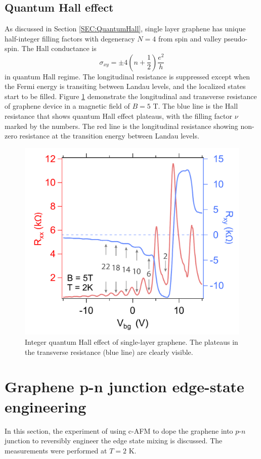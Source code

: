 \documentclass[pdflatex, sectionletters, 12pt, final, phd]{pittetd}    %
\begin{document}
\subsection{Quantum Hall effect}

As discussed in Section \ref{SEC:QuantumHall}, single layer graphene has unique half-integer filling factors with degeneracy $N = 4$ from spin and valley pseudo-spin. The Hall conductance is
$$
\sigma_{xy} = \pm 4\left(n + \frac{1}{2}\right)\frac{e^2}{h}
$$
in quantum Hall regime. The longitudinal resistance is suppressed except when the Fermi energy is transiting between Landau levels, and the localized states start to be filled. Figure \ref{FIG:HallResistance} demonstrate the longitudinal and transverse resistance of graphene device in a magnetic field of $B = 5$ T. The blue line is the Hall resistance that shows quantum Hall effect plateaus, with the filling factor $\nu$ marked by the numbers. The red line is the longitudinal resistance showing non-zero resistance at the transition energy between Landau levels.

\begin{figure}[h!]
	\centering
	\includegraphics[width=.55\textwidth]{Drawing/HallResistance.pdf}
	\caption[Integer quantum Hall effect of single-layer graphene]{Integer quantum Hall effect of single-layer graphene. The plateaus in the transverse resistance (blue line) are clearly visible.}
	\label{FIG:HallResistance}
\end{figure}

\section{Graphene p-n junction edge-state engineering}
\label{SEC:PNJunction}

In this section, the experiment of using c-AFM to dope the graphene into $p$-$n$ junction to reversibly engineer the edge state mixing is discussed. The measurements were performed at $T = 2$ K. 
\end{document}
